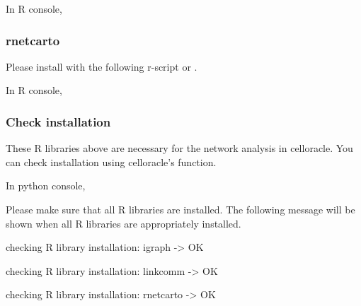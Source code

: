 \documentclass[letterpaper,10pt,english]{sphinxmanual}
\begin{document}
In R console,

\begin{sphinxVerbatim}[commandchars=\\\{\}]
\end{sphinxVerbatim}


\subsubsection{rnetcarto}
\label{\detokenize{installation/index:id11}}
Please install  with the following r-script or  .

In R console,

\begin{sphinxVerbatim}[commandchars=\\\{\}]
\end{sphinxVerbatim}


\subsubsection{Check installation}
\label{\detokenize{installation/index:check-installation}}
These R libraries above are necessary for the network analysis in celloracle. You can check installation using celloracle’s function.

In python console,

\begin{sphinxVerbatim}[commandchars=\\\{\}]
   
\end{sphinxVerbatim}

Please make sure that all R libraries are installed. The following message will be shown when all R libraries are appropriately installed.

\begin{DUlineblock}{0em}
\item[] checking R library installation: igraph -\textgreater{} OK
\item[] checking R library installation: linkcomm -\textgreater{} OK
\item[] checking R library installation: rnetcarto -\textgreater{} OK
\end{DUlineblock}
\end{document}
